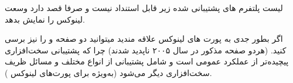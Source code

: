 
\begin{note}
لیست پلتفرم های پشتیبانی شده زیر قابل استنداد نیست و صرفا قصد دارد وسعت لینوکس را نمایش بدهد.
\end{note}


اگر بطور جدی به پورت های لینوکس علاقه مندید میتوانید دو صفحه
و
را نیز برسی کنید.  (هردو صفحه مذکور در سال ۲۰۰۵ ناپدید شدند)
چرا که پشتیبانی سخت‌افزاری پیچیده‌تر از عملکرد عمومی  است و شامل پشتیبانی از
انواع مختلف  و مسائل ظریف سخت‌افزاری دیگر می‌شود (به‌ویژه برای پورت‌های لینوکس
).





